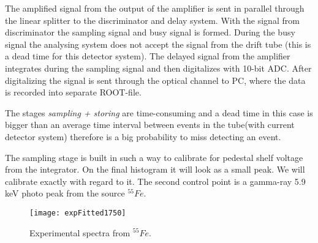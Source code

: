 	The amplified signal from the output of the amplifier is sent in parallel through the linear splitter to the discriminator and delay system. With the signal from discriminator the sampling signal and busy signal is formed. During the busy signal the analysing system does not accept the signal from the drift tube (this is a dead time for this detector system). The delayed signal from the amplifier integrates during the sampling signal and then digitalizes with 10-bit ADC. After digitalizing the signal is sent through the optical channel to PC, where the data is recorded into separate ROOT-file.
	
	The stages {\it sampling + storing} are time-consuming and a dead time in this case is bigger than an average time interval between events in the tube(with current detector system) therefore is a big probability to miss detecting an event.
	
	The sampling stage is built in such a way to calibrate for pedestal shelf voltage from the integrator. On the final histogram it will look as a small peak. We will calibrate exactly with regard to it. The second control point is a gamma-ray 5.9 keV photo peak from the source $^{55}Fe$.
	
	\begin{figure}
	\centering
	\texttt{[image: expFitted1750]}
	
	\caption{Experimental spectra from $^{55}Fe$.}
	\label{fig:expFitted1750}
	\end{figure}
	
	
	
	
